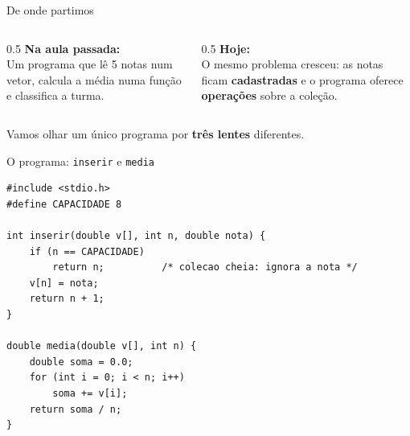 \documentclass[aspectratio=169]{beamer}
\begin{document}
\begin{frame}[shrink=5]{De onde partimos}
  \begin{columns}[T]
    \begin{column}{0.5\textwidth}
      \textbf{Na aula passada:}\\[4pt]
      Um programa que lê 5 notas num vetor, calcula a média numa função e
      classifica a turma.
    \end{column}
    \begin{column}{0.5\textwidth}
      \textbf{Hoje:}\\[4pt]
      O mesmo problema cresceu: as notas ficam \textbf{cadastradas} e o
      programa oferece \textbf{operações} sobre a coleção.
    \end{column}
  \end{columns}
  \vspace{1em}
  \begin{center}
  \end{center}
  \begin{center}
    Vamos olhar um único programa por \textbf{três lentes} diferentes.
  \end{center}
\end{frame}

\begin{frame}[fragile,shrink=5]{O programa: \texttt{inserir} e \texttt{media}}
\begin{lstlisting}
#include <stdio.h>
#define CAPACIDADE 8

int inserir(double v[], int n, double nota) {
    if (n == CAPACIDADE)
        return n;          /* colecao cheia: ignora a nota */
    v[n] = nota;
    return n + 1;
}

double media(double v[], int n) {
    double soma = 0.0;
    for (int i = 0; i < n; i++)
        soma += v[i];
    return soma / n;
}
\end{lstlisting}
\end{frame}
\end{document}
